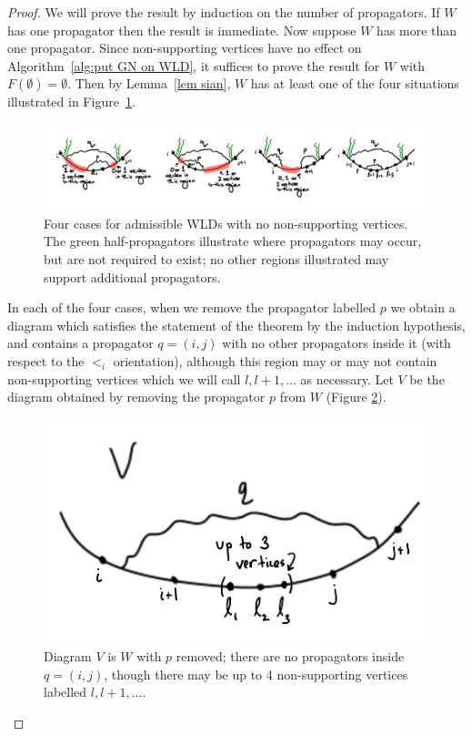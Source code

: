 \documentclass[11pt]{article}
\theoremstyle{remark}
\theoremstyle{definition}
\begin{document}
\begin{proof}
We will prove the result by induction on the number of propagators.  If $W$ has one propagator then the result is immediate.  Now suppose $W$ has more than one propagator.  Since non-supporting vertices have no effect on Algorithm~\ref{alg:put GN on WLD}, it suffices to prove the result for $W$ with $F(\emptyset) = \emptyset$.  Then by Lemma~\ref{lem sian}, $W$ has at least one of the four situations illustrated in Figure~\ref{fig 3 cases}.

\begin{figure}
    \includegraphics[scale=0.8]{3cases}
    \caption{Four cases for admissible WLDs with no non-supporting vertices. The green half-propagators illustrate where propagators may occur, but are not required to exist; no other regions illustrated may support additional propagators.}\label{fig 3 cases}
  \end{figure}


In each of the four cases, when we remove the propagator labelled $p$ we obtain a diagram which satisfies the statement of the theorem by the induction hypothesis, and contains a propagator ${q = (i,j)}$ with no other propagators inside it (with respect to the $<_i$ orientation), although this region may or may not contain non-supporting vertices which we will call $l, l+1, \ldots$ as necessary. Let $V$ be the diagram obtained by removing the propagator $p$ from $W$ (Figure \ref{fig V diagram}). 


\begin{figure}
\includegraphics[scale=0.8]{Vdiagram_modified}
\caption{Diagram $V$ is $W$ with $p$ removed; there are no propagators inside $q = (i,j)$, though there may be up to 4 non-supporting vertices labelled $l, l+1, \ldots$.}
\label{fig V diagram}
\end{figure}



\end{proof}
\end{document}
